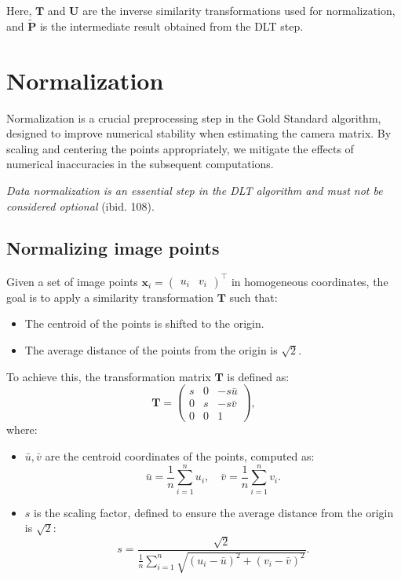 \documentclass[12pt]{article}
\begin{document}
Here, $ \mathbf{T} $ and $ \mathbf{U} $ are the inverse similarity transformations used for normalization, and $ \tilde{\mathbf{P}} $ is the intermediate result obtained from the DLT step.

\section{Normalization}

Normalization is a crucial preprocessing step in the Gold Standard algorithm, designed to improve numerical stability when estimating the camera matrix. By scaling and centering the points appropriately, we mitigate the effects of numerical inaccuracies in the subsequent computations.

\textit{Data normalization is an essential step in the DLT algorithm and must not be considered optional} (ibid. 108).

\subsection{Normalizing image points}
Given a set of image points $ \mathbf{x}_i = \begin{pmatrix} u_i & v_i \end{pmatrix}^\top $ in homogeneous coordinates, the goal is to apply a similarity transformation $ \mathbf{T} $ such that:
\begin{itemize}
    \item The centroid of the points is shifted to the origin.
    \item The average distance of the points from the origin is $\sqrt{2}$.
\end{itemize}

To achieve this, the transformation matrix $ \mathbf{T} $ is defined as:
$$
\mathbf{T} = 
\begin{pmatrix} 
s & 0 & -s \bar{u} \\
0 & s & -s \bar{v} \\
0 & 0 & 1 
\end{pmatrix},
$$
where:
\begin{itemize}
    \item $ \bar{u}, \bar{v} $ are the centroid coordinates of the points, computed as:
    $$
    \bar{u} = \frac{1}{n} \sum_{i=1}^n u_i, \quad \bar{v} = \frac{1}{n} \sum_{i=1}^n v_i.
    $$
    \item $ s $ is the scaling factor, defined to ensure the average distance from the origin is $\sqrt{2}$:
    $$
    s = \frac{\sqrt{2}}{\displaystyle\frac{1}{n} \sum_{i=1}^n \sqrt{(u_i - \bar{u})^2 + (v_i - \bar{v})^2}}.
    $$
\end{itemize}
\end{document}
